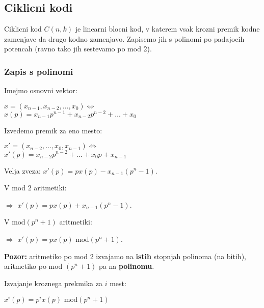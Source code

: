 \documentclass{article}
\begin{document}
\begin{multicols}{2}
	\subsection{Ciklicni kodi}
	Ciklicni kod $C(n, k)$ je linearni blocni kod, v katerem vsak krozni premik kodne zamenjave
	da drugo kodno zamenjavo. Zapisemo jih s polinomi po padajocih potencah (ravno tako jih sestevamo po mod 2).

	\subsubsection{Zapis s polinomi}
	Imejmo osnovni vektor:
	\begin{center}
		$x = (x_{n-1}, x_{n-2}, \dots, x_0) \Leftrightarrow$\\
		$x(p) = x_{n-1}p^{n-1} + x_{n-2}p^{n-2} + \dots + x_0$
	\end{center}
	Izvedemo premik za eno mesto:
	\begin{center}
		$x' = (x_{n-2}, \dots, x_0, x_{n-1}) \Leftrightarrow$\\
		$x'(p) = x_{n-2}p^{n-2} + \dots + x_0p + x_{n-1}$
	\end{center}
	Velja zveza: $x'(p) = px(p) - x_{n-1}(p^n -1)$.

	V mod $2$ aritmetiki:
	\begin{center}
		$\Rightarrow$ $x'(p) = px(p) + x_{n-1}(p^n -1)$.
	\end{center}

	V $\text{mod}(p^n + 1)$ aritmetiki:
	\begin{center}
		$\Rightarrow$ $x'(p) = px(p) \text{ mod}(p^n + 1)$.
	\end{center}

	\textbf{Pozor:} aritmetiko po mod 2 izvajamo na \textbf{istih} stopnjah polinoma (na bitih), aritmetiko
	po mod $(p^n + 1)$ pa na \textbf{polinomu}.

	Izvajanje kroznega prekmika za $i$ mest:
	\begin{center}
		\begin{math}
			x^i(p) = p^i x(p) \text{ mod} (p^n + 1)
		\end{math}
	\end{center}


\end{multicols}
\end{document}
